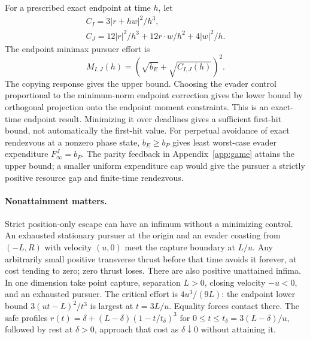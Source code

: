 For a prescribed exact endpoint at time $h$, let
\begin{equation}
 \begin{gathered}
 C_I=3|r+hw|^2/h^3,\\
 C_J=12|r|^2/h^3+12r\cdot w/h^2+4|w|^2/h.
 \end{gathered}
\end{equation}
The endpoint minimax pursuer effort is
\begin{equation}
 M_{I,J}(h)=(\sqrt{b_E}+\sqrt{C_{I,J}(h)})^2.
\end{equation}
The copying response gives the upper bound. Choosing the evader control
proportional to the minimum-norm endpoint correction gives the lower
bound by orthogonal projection onto the endpoint moment constraints.
This is an exact-time endpoint result. Minimizing it over deadlines gives
a sufficient first-hit bound, not automatically the first-hit value.
For perpetual avoidance of exact rendezvous at a nonzero phase state,
$b_E\ge b_P$ gives least worst-case evader expenditure
$F^J_\infty=b_P$. The parity feedback in Appendix~\ref{app:game} attains
the upper bound; a smaller uniform expenditure cap would give the
pursuer a strictly positive resource gap and finite-time rendezvous.

\paragraph{Nonattainment matters.}
Strict position-only escape can have an infimum without a minimizing
control. An exhausted stationary pursuer at the origin and an evader
coasting from $(-L,R)$ with velocity $(u,0)$ meet the capture boundary
at $L/u$. Any arbitrarily small positive transverse thrust before that
time avoids it forever, at cost tending to zero; zero thrust loses.
There are also positive unattained infima. In one dimension take point
capture, separation $L>0$, closing velocity $-u<0$, and an exhausted
pursuer. The critical effort is $4u^3/(9L)$: the endpoint lower bound
$3(ut-L)^2/t^3$ is largest at $t=3L/u$. Equality forces contact there.
The safe profiles $r(t)=\delta+(L-\delta)(1-t/t_\delta)^3$ for
$0\le t\le t_\delta=3(L-\delta)/u$, followed by rest at $\delta>0$,
approach that cost as $\delta\downarrow0$ without attaining it.

